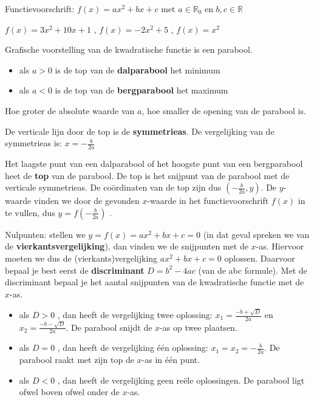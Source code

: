 \begin{definitie}
	Functievoorschrift: $f(x)=ax^{2}+bx+c$ met $a\in\mathbb{R}_{0}$
en $b,c\in\mathbb{R}$ 

\end{definitie}

\begin{voorbeeld}
	$f(x)=3x^{2}+10x+1$ , $f(x)=-2x^{2}+5$
, $f(x)=x^{2}$
\end{voorbeeld}

Grafische voorstelling van de kwadratische functie
is een parabool.


\begin{itemize}
\item als $a>0$ is de top van de \textbf{dalparabool} het minimum
\item als $a<0$ is de top van de \textbf{bergparabool} het maximum
\end{itemize}
Hoe groter de absolute waarde van $a$, hoe smaller de opening
van de parabool is.

De verticale lijn door de top is de \textbf{symmetrieas}.
De vergelijking van de symmetrieas is: $x=-\frac{b}{2a}$ 

Het laagste punt van een dalparabool of het hoogste punt
van een bergparabool heet de \textbf{top} van de parabool. De top
is het snijpunt van de parabool met de verticale symmetrieas. De co\"ordinaten
van de top zijn dus $(-\frac{b}{2a},y)$. De $y$-waarde vinden we
door de gevonden $x$-waarde in het functievoorschrift $f(x)$ in
te vullen, dus $y=f(-\frac{b}{2a})$ .

Nulpunten: stellen we $y=f(x)=ax^{2}+bx+c=0$
(in dat geval spreken we van de \textbf{vierkantsvergelijking}), dan
vinden we de snijpunten met de $x$-as. Hiervoor moeten we dus de
(vierkants)vergelijking $ax^{2}+bx+c=0$ oplossen. Daarvoor bepaal
je best eerst de \textbf{discriminant} $D=b^{2}-4ac$ (van de abc
formule). Met de discriminant bepaal je het aantal snijpunten van
de kwadratische functie met de $x$-as.
\begin{itemize}
\item als $D>0$ , dan heeft de vergelijking twee oplossing: $x_{1}=\frac{-b+\sqrt{D}}{2a}$
en $x_{2}=\frac{-b-\sqrt{D}}{2a}$. De parabool snijdt de $x$-as
op twee plaatsen.
\item als $D=0$ , dan heeft de vergelijking \'e\'en oplossing: $x_{1}=x_{2}=-\frac{b}{2a}$.
De parabool raakt met zijn top de $x$-as in \'e\'en punt.
\item als $D<0$ , dan heeft de vergelijking geen re\"ele oplossingen. De
parabool ligt ofwel boven ofwel onder de $x$-as.
\end{itemize}

